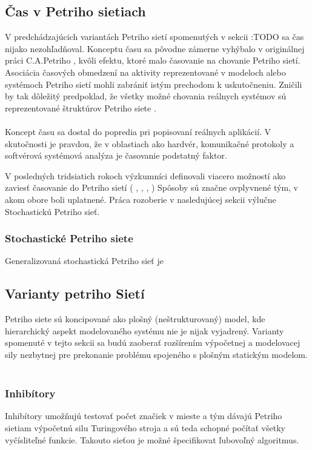 \subsection{Čas v Petriho sietiach}

V predchádzajúcich variantách Petriho sietí spomenutých v sekcii :TODO sa čas nijako nezohľadňoval. Konceptu času sa pôvodne zámerne vyhýbalo v originálnej práci C.A.Petriho \cite{petri1966communication}, kvôli efektu, ktoré malo časovanie na chovanie Petriho sietí. Asociácia časových obmedzení na aktivity reprezentované v modeloch alebo systémoch Petriho sietí mohli zabrániť istým prechodom k uskutočneniu. Zničili by tak dôležitý predpoklad, že všetky možné chovania reálnych systémov sú reprezentované štruktúrov Petriho siete \cite{marsan1995modelling}. \\\\
Koncept času sa dostal do popredia pri popisovaní reálnych aplikácií. V skutočnosti je pravdou, že v oblastiach ako hardvér, komunikačné protokoly a softvérová systémová analýza je časovanie podstatný faktor.

V posledných tridsiatich rokoch výzkumníci definovali viacero možností ako zaviesť časovanie do Petriho sietí ( \cite{Ramchandani1974}, \cite{Holliday1987}, \cite{Ramamoorthy1980}, \cite{Merlin1976})  Spôsoby sú značne ovplyvnené tým, v akom obore boli uplatnené.
Práca rozoberie v nasledujúcej sekcii výlučne Stochastickú Petriho sieť.



\subsubsection{Stochastické Petriho siete}
Generalizovaná stochastická Petriho sieť je 



\subsection{Varianty petriho Sietí}
Petriho siete sú koncipované ako plošný (neštrukturovaný) model, kde hierarchický aspekt modelovaného systému nie je nijak vyjadrený. Varianty spomenuté v tejto sekcii sa budú zaoberať rozšírením výpočetnej a modelovacej sily nezbytnej pre prekonanie problému spojeného s plošným statickým modelom. \\\\
\subsubsection{Inhibítory}
Inhibítory umožňujú testovať počet značiek v mieste a tým dávajú Petriho sietiam výpočetnú silu Turingového stroja a sú teda schopné počítať všetky vyčísliteľné funkcie. Takouto sieťou je možné špecifikovat ľubovoľný algoritmus.
